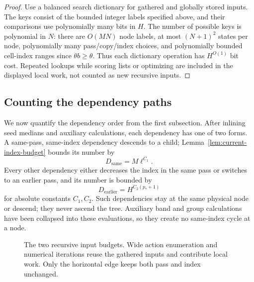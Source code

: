 \begin{proof}
Use a balanced search dictionary for gathered and globally stored
inputs.  The keys consist of the bounded integer labels specified
above, and their comparisons use polynomially many bits in $H$.
The number of possible keys is polynomial in $N$: there are
$O(MN)$ node labels, at most $(N+1)^2$ states per node, polynomially
many pass/copy/index choices, and polynomially bounded cell-index
ranges since $\theta b\ge\theta$.  Thus each dictionary operation
has $H^{O(1)}$ bit cost.  Repeated lookups while scoring lists or
optimizing are included in the displayed local work, not counted
as new recursive inputs.
\end{proof}

\subsection{Counting the dependency paths}

We now quantify the dependency order from the first subsection.
After inlining seed medians and auxiliary calculations, each
dependency has one of two forms.  A same-pass, same-index dependency
descends to a child;
Lemma~\ref{lem:current-index-budget} bounds its number by
\[
 D_{\mathrm{same}}=M\ell^{C_1}.
\]
Every other dependency either decreases the index in the same pass
or switches to an earlier pass, and its number is bounded by
\[
 D_{\mathrm{earlier}}=H^{C_2(p_*+1)}
\]
for absolute constants $C_1,C_2$.  Such dependencies stay at the
same physical node or descend; they never ascend the tree.
Auxiliary band and group calculations have been collapsed into
these evaluations, so they create no same-index cycle at a node.

\begin{figure}[htbp]
\centering
{}
\caption{The two recursive input budgets.  Wide action enumeration and
numerical iterations reuse the gathered inputs and contribute local
work.  Only the horizontal edge keeps both pass and index unchanged.}
\label{fig:dependency-budgets}
\end{figure}

